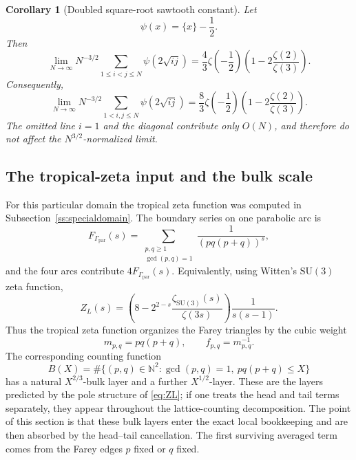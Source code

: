 \documentclass[a4paper,american,11pt]{amsart}
\theoremstyle{plain}
\newtheorem{corollary}[theorem]{Corollary}
\theoremstyle{definition}
\newcommand{\N}{\mathbb N}
\begin{document}
\begin{corollary}[Doubled square-root sawtooth constant]\label{cor:saw}
Let
\[
\psi(x)=\{x\}-\frac12.
\]
Then
\begin{equation}\label{eq:triSaw}
\lim_{N\to\infty}N^{-3/2}
\sum_{1\le i<j\le N}\psi(2\sqrt{ij})
=
\frac43\zeta\!\left(-\frac12\right)
\left(1-2\frac{\zeta(2)}{\zeta(3)}\right).
\end{equation}
Consequently,
\begin{equation}\label{eq:squareSaw}
\lim_{N\to\infty}N^{-3/2}
\sum_{1<i,j\le N}\psi(2\sqrt{ij})
=
\frac83\zeta\!\left(-\frac12\right)
\left(1-2\frac{\zeta(2)}{\zeta(3)}\right).
\end{equation}
The omitted line \(i=1\) and the diagonal contribute only \(O(N)\), and
therefore do not affect the \(N^{3/2}\)-normalized limit.
\end{corollary}

\subsection{The tropical-zeta input and the bulk scale}

For this particular domain the tropical zeta function was computed in
Subsection~\ref{ss:specialdomain}. The boundary series on one parabolic arc is
\begin{equation}\label{eq:FGamma}
F_{\Gamma_{\mathrm{par}}}(s)
=
\sum_{\substack{p,q\ge1\\ \gcd(p,q)=1}}
\frac{1}{(pq(p+q))^s},
\end{equation}
and the four arcs contribute \(4F_{\Gamma_{\mathrm{par}}}(s)\). Equivalently,
using Witten's \(\mathrm{SU}(3)\) zeta function,
\begin{equation}\label{eq:ZL}
Z_L(s)
=
\left(
8-2^{2-s}\frac{\zeta_{\mathrm{SU}(3)}(s)}{\zeta(3s)}
\right)
\frac{1}{s(s-1)}.
\end{equation}
Thus the tropical zeta function organizes the Farey triangles by the cubic
weight
\begin{equation}\label{eq:mpq}
m_{p,q}=pq(p+q),
\qquad
f_{p,q}=m_{p,q}^{-1}.
\end{equation}
The corresponding counting function
\begin{equation}\label{eq:Bcount}
B(X)
=
\#\{(p,q)\in\N^2:\gcd(p,q)=1,\ pq(p+q)\le X\}
\end{equation}
has a natural \(X^{2/3}\)-bulk layer and a further \(X^{1/2}\)-layer. These
are the layers predicted by the pole structure of \eqref{eq:ZL}; if one
treats the head and tail terms separately, they appear throughout the
lattice-counting decomposition. The point of this section is that these bulk
layers enter the exact local bookkeeping and are then absorbed by the
head--tail cancellation. The first surviving averaged term comes from the
Farey edges \(p\) fixed or \(q\) fixed.
\end{document}
